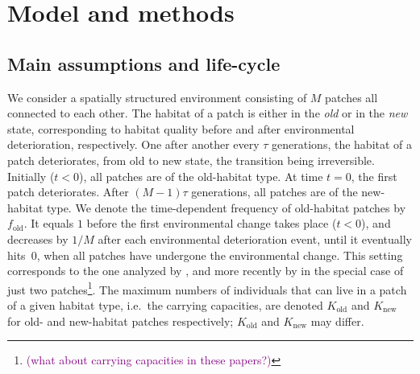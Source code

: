 \documentclass[a4paper,11pt]{article}
\newcommand{\florence}[1]{\textcolor{purple}{(#1)}} %
\newcommand{\chg}[1]{\textcolor{change}{#1}}
\begin{document}
\section*{Model and methods}

\subsection*{Main assumptions and life-cycle}
We consider a spatially structured environment consisting of $M$ patches all connected to each other. The habitat of a patch is either in the \textit{old} or in the \textit{new} state, corresponding to habitat quality before and after environmental deterioration, respectively. One after \chg{another} every $\tau$ generations, the habitat of a patch deteriorates, from old to new state, the transition being irreversible. Initially ($t<0$), all patches are of the old-habitat type. At time $t=0$, the first patch deteriorates. After $(M-1)\tau$ generations, all patches are of the new-habitat type. We denote the time-dependent frequency of old-habitat patches by $f_{\text{old}}$. It equals $1$ before the first environmental change takes place ($t<0$), and decreases by $1/M$ after each environmental deterioration event, until it eventually hits~$0$, when all patches have undergone the environmental change. This setting corresponds to the one analyzed by \citet{uecker_2014}, and more recently by \citet{tomasini_2019} in the special case of just two patches\footnote{\florence{what about carrying capacities in these papers?}}. The maximum numbers of individuals that can live in a patch of a given habitat type, i.e.\ the carrying capacities, are denoted $K_{\text{old}}$ and $K_{\text{new}}$ for old- and new-habitat patches respectively; $K_{\text{old}}$ and $K_{\text{new}}$ may differ.
\end{document}
